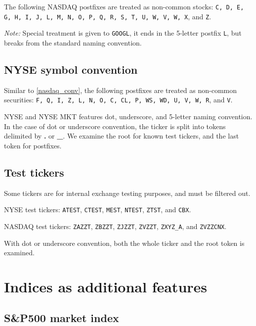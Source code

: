 \documentclass[8pt,oneside]{book}
\begin{document}
The following NASDAQ postfixes are treated as non-common stocks: \texttt{C, D, E, G, H, I, J,
L, M, N, O, P, Q, R, S, T, U, W, V, W, X}, and \texttt{Z}.

\emph{Note:} Special treatment is given to \texttt{GOOGL}, it ends in the 5-letter postfix \texttt{L}, but
breaks from the standard naming convention.

\subsection{NYSE symbol convention}

Similar to \cref{nasdaq_conv}, the following postfixes are treated as non-common securities:
\texttt{F, Q, I, Z, L, N, O, C, CL, P, WS, WD, U, V, W, R}, and \texttt{V}.

NYSE and NYSE MKT features dot, underscore, and 5-letter naming convention. In the case of dot or underscore
convention, the ticker is split into tokens delimited by \textbf{.} or \textbf{\_}. We examine the root for
known test tickers, and the last token for postfixes.

\subsection{Test tickers}

Some tickers are for internal exchange testing purposes, and must be filtered out.

\vspace{10pt}

NYSE test tickers: \texttt{ATEST}, \texttt{CTEST}, \texttt{MEST},
\texttt{NTEST}, \texttt{ZTST}, and \texttt{CBX}. 

\vspace{10pt}

NASDAQ test tickers: \texttt{ZAZZT}, \texttt{ZBZZT},
\texttt{ZJZZT}, \texttt{ZVZZT}, \texttt{ZXYZ\_A}, and \texttt{ZVZZCNX}.

With dot or underscore convention, both the whole ticker and the root token is examined.

\section{Indices as additional features}

\subsection{S\&P500 market index}
\end{document}
